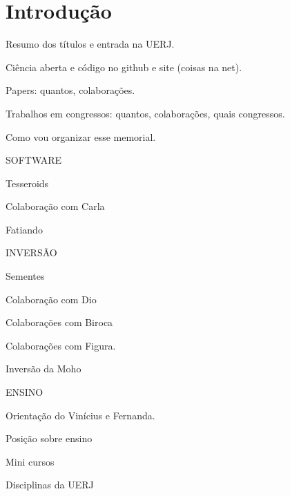 \chapter{Introdução}

Resumo dos títulos e entrada na UERJ.

Ciência aberta e código no github e site (coisas na net).

Papers: quantos, colaborações.

Trabalhos em congressos: quantos, colaborações, quais congressos.

Como vou organizar esse memorial.

SOFTWARE

Tesseroids

Colaboração com Carla

Fatiando

INVERSÃO

Sementes

Colaboração com Dio

Colaborações com Biroca

Colaborações com Figura.

Inversão da Moho

ENSINO

Orientação do Vinícius e Fernanda.

Posição sobre ensino

Mini cursos

Disciplinas da UERJ
